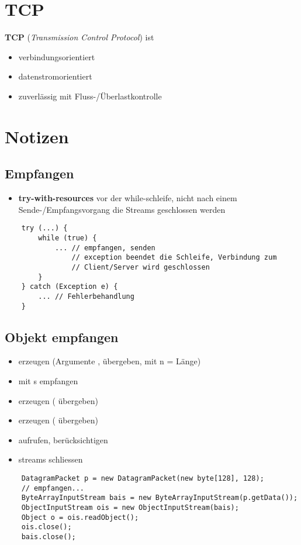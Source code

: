 \section{TCP}

\textbf{TCP} (\textit{Transmission Control Protocol}) ist

\begin{itemize}
    \item verbindungsorientiert
    \item datenstromorientiert
    \item zuverlässig mit Fluss-/Überlastkontrolle
\end{itemize}


\section*{Notizen}

\subsection*{Empfangen}
\begin{itemize}
    \item \textbf{try-with-resources} vor der while-schleife, nicht nach einem Sende-/Empfangsvorgang die Streams geschlossen werden
\end{itemize}


\begin{verbatim}
    try (...) {
        while (true) {
            ... // empfangen, senden
                // exception beendet die Schleife, Verbindung zum
                // Client/Server wird geschlossen
        }
    } catch (Exception e) {
        ... // Fehlerbehandlung
    }
\end{verbatim}

\subsection*{Objekt empfangen}
\begin{itemize}
    \item {}  erzeugen (Argumente ,  übergeben, mit n = Länge)
    \item mit s  empfangen
    \item {}  erzeugen ( übergeben)
    \item {}  erzeugen ( übergeben)
    \item {} aufrufen,  berücksichtigen
    \item streams schliessen
\end{itemize}


\begin{verbatim}
    DatagramPacket p = new DatagramPacket(new byte[128], 128);
    // empfangen...
    ByteArrayInputStream bais = new ByteArrayInputStream(p.getData());
    ObjectInputStream ois = new ObjectInputStream(bais);
    Object o = ois.readObject();
    ois.close();
    bais.close();
\end{verbatim}